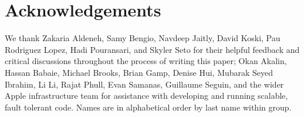 \section{Acknowledgements}
\label{sec:acknowledgements}

We thank
Zakaria Aldeneh,
Samy Bengio,
Navdeep Jaitly,
David Koski,
Pau Rodriguez Lopez,
Hadi Pouransari, and
Skyler Seto
for their helpful feedback and critical discussions throughout the process of writing this paper;
Okan Akalin,
Hassan Babaie, 
Michael Brooks,
Brian Gamp,
Denise Hui,
Mubarak Seyed Ibrahim, 
Li Li, 
Rajat Phull,
Evan Samanas, 
Guillaume Seguin, 
and the wider Apple infrastructure team for assistance with developing and running scalable, fault tolerant code. 
Names are in alphabetical order by last name within group.
